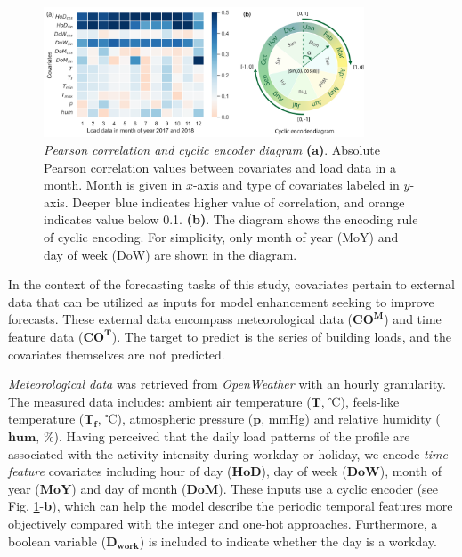 \begin{figure}[!ht]
\centering
  \includegraphics[width=0.85\textwidth]{figures/Pearson_correlation_and_cyclic.png}
  \caption{\textit{Pearson correlation and cyclic encoder diagram} \textbf{(a)}. Absolute Pearson correlation values between covariates and load data in a month. Month is given in $x$-axis and type of covariates labeled in $y$-axis. Deeper blue indicates higher value of correlation, and orange indicates value below 0.1. \textbf{(b)}. The diagram shows the encoding rule of cyclic encoding. For simplicity, only month of year (MoY) and day of week (DoW) are shown in the diagram. }
  \label{fig:pearson_cyclic}
\end{figure}


In the context of the forecasting tasks of this study, covariates pertain to external data that can be utilized as inputs for model enhancement seeking to improve forecasts. These external data encompass meteorological data ($\mathbf{CO^M}$) and time feature data ($\mathbf{CO^T}$).  The target to predict is the series of building loads, and the covariates themselves are not predicted. 

\emph{Meteorological data} was retrieved from \emph{OpenWeather} with an hourly granularity. The measured data includes: ambient air temperature ($\mathbf{T}$, ℃), feels-like temperature ($\mathbf{T_f}$, ℃), atmospheric pressure ($\mathbf{p}$, mmHg) and relative humidity ($\mathbf{hum}$, \%). Having perceived that the daily load patterns of the profile are associated with the activity intensity during workday or holiday, we encode \emph{time feature} covariates including hour of day ($\mathbf{HoD}$), day of week ($\mathbf{DoW}$), month of year ($\mathbf{MoY}$) and day of month ($\mathbf{DoM}$). These inputs use a cyclic encoder (see Fig. \ref{fig:pearson_cyclic}-\textbf{b}), which can help the model describe the periodic temporal features more objectively compared with the integer and one-hot approaches\cite{cyclic_encode}. Furthermore, a boolean variable ($\mathbf{D_{work}}$) is included to indicate whether the day is a workday.

